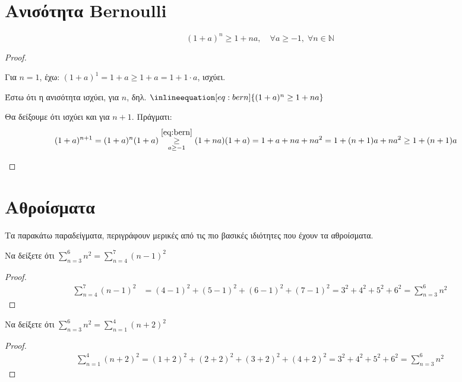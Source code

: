 \documentclass[main.tex]{subfiles}
\begin{document}
\section{Ανισότητα Bernoulli}
\[
  \boxed{(1+a)^{n} \geq 1 + na, \quad \forall a \geq -1, \; \forall n \in
  \mathbb{N}}
\] 
\begin{proof}
\item {}
  \begin{myitemize}
    \item Για $ n=1 $, έχω: $ (1+a)^{1} = 1+a \geq 1+a = 1 + 1 \cdot a $, ισχύει.
    \item Έστω ότι η ανισότητα ισχύει, για $ n $, δηλ. $\inlineequation[eq:bern]
      {(1+a)^{n} \geq 1 + na}$
    \item Θα δείξουμε ότι ισχύει και για $ n+1 $. Πράγματι:
      \begin{align*}
        (1+a)^{n+1} = (1+a)^{n}(1+a) \overset{\eqref{eq:bern}}
        {\underset{a \geq -1}{\geq}} (1+na)(1+a) &= 1 + a + na + na^{2} 
        = 1 + (n+1)a + na^{2} \geq 1 + (n+1)a
      \end{align*}
  \end{myitemize}
\end{proof}

\section{Αθροίσματα}


Τα παρακάτω παραδείγματα, περιγράφουν μερικές από τις πιο βασικές ιδιότητες που 
έχουν τα αθροίσματα.

\begin{example}
  Να δείξετε ότι $ \sum_{n=3}^{6} n^{2} = \sum_{n=4}^{7} (n-1)^{2}   $
\end{example}
\begin{proof}
  \begin{align*}
    \sum_{n=4}^{7} (n-1)^{2} &= (4-1)^{2}+(5-1)^{2}+(6-1)^{2}+(7-1)^{2} 
    = 3^{2}+4^{2}+5^{2}+6^{2} = \sum_{n=3}^{6} n^{2} 
  \end{align*}
\end{proof}

\begin{example}
  Να δείξετε ότι $ \sum_{n=3}^{6} n^{2} = \sum_{n=1}^{4} (n+2)^{2}   $
\end{example}
\begin{proof}
  \begin{align*}
    \sum_{n=1}^{4} (n+2)^{2} = (1+2)^{2}+(2+2)^{2}+(3+2)^{2}+(4+2)^{2}=
    3^{2}+4^{2}+5^{2}+6^{2} = \sum_{n=3}^{6} n^{2} 
  \end{align*}
\end{proof}
\end{document}
